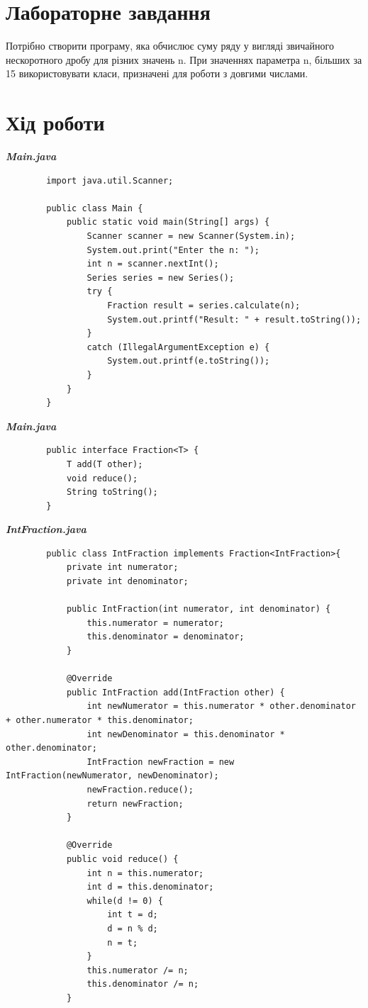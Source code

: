 \documentclass[14pt]{extreport}
\begin{document}
\begin{normalsize}
	\section*{Лабораторне завдання}
	Потрібно створити програму, яка обчислює суму ряду у вигляді звичайного нескоротного дробу для різних значень n. При значеннях параметра n, більших за 15 використовувати класи, призначені для роботи з довгими числами. 
	
	\section*{Хід роботи}

	\textbf{\textit{Main.java}}
	\begin{lstlisting}
		import java.util.Scanner;
		
		public class Main {
			public static void main(String[] args) {
				Scanner scanner = new Scanner(System.in);
				System.out.print("Enter the n: ");
				int n = scanner.nextInt();
				Series series = new Series();
				try {
					Fraction result = series.calculate(n);
					System.out.printf("Result: " + result.toString());
				}
				catch (IllegalArgumentException e) {
					System.out.printf(e.toString());
				}
			}
		}
	\end{lstlisting}
	
	\textbf{\textit{Main.java}}
	\begin{lstlisting}
		public interface Fraction<T> {
			T add(T other);
			void reduce();
			String toString();
		}
	\end{lstlisting}
	
	\textbf{\textit{IntFraction.java}}
	\begin{lstlisting}
		public class IntFraction implements Fraction<IntFraction>{
			private int numerator;
			private int denominator;
			
			public IntFraction(int numerator, int denominator) {
				this.numerator = numerator;
				this.denominator = denominator;
			}
			
			@Override
			public IntFraction add(IntFraction other) {
				int newNumerator = this.numerator * other.denominator + other.numerator * this.denominator;
				int newDenominator = this.denominator * other.denominator;
				IntFraction newFraction = new IntFraction(newNumerator, newDenominator);
				newFraction.reduce();
				return newFraction;
			}
			
			@Override
			public void reduce() {
				int n = this.numerator;
				int d = this.denominator;
				while(d != 0) {
					int t = d;
					d = n % d;
					n = t;
				}
				this.numerator /= n;
				this.denominator /= n;
			}
			

\end{lstlisting}
\end{normalsize}
\end{document}
